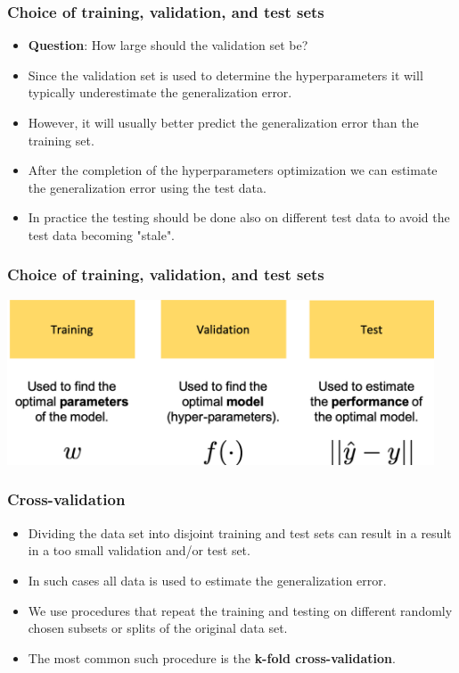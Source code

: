 \documentclass[notes]{beamer}          %
\begin{document}
\begin{frame}
\frametitle{Choice of training, validation, and test sets}
    \begin{itemize}
        \item {\bf Question}: How large should the validation set be?
        \item Since the validation set is used to determine the hyperparameters it will typically underestimate the generalization error.
        \item However, it will usually better predict the generalization error than the training set.
        \item After the completion of the hyperparameters optimization we can estimate the generalization error using the test data.
        \item In practice the testing should be done also on different test data to avoid the test data becoming "stale".
    \end{itemize}
\end{frame}


\begin{frame}
\frametitle{Choice of training, validation, and test sets}
    \begin{center}
        \includegraphics[width=0.95\textwidth]{figures/week_2/subsets.png}
    \end{center}
\end{frame}


\begin{frame}
\frametitle{Cross-validation}
    \begin{itemize}
        \item Dividing the data set into disjoint training and test sets can result in a result in a too small validation and/or test set.
        \item In such cases all data is used to estimate the generalization error.
        \item We use procedures that repeat the training and testing on different randomly chosen subsets or splits of the original data set.
        \item The most common such procedure is the {\bf k-fold cross-validation}.
    \end{itemize}
\end{frame}
\end{document}
